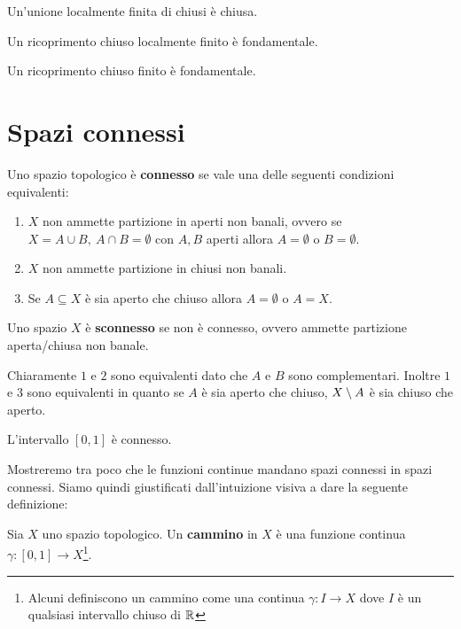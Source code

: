 \begin{multicols*}{2}
\begin{corollary}
Un'unione localmente finita di chiusi è chiusa.
\end{corollary}

\begin{theorem}\label{RicoprimentoChiusoLocalmenteFinitoEFondamentale}
Un ricoprimento chiuso localmente finito è fondamentale.
\end{theorem}
\begin{corollary}
Un ricoprimento chiuso finito è fondamentale.
\end{corollary}

\section{Spazi connessi}

\begin{definition}[Connessione]
Uno spazio topologico è \textbf{connesso} se vale una delle seguenti condizioni equivalenti:
\begin{enumerate}[noitemsep]
\item $X$ non ammette partizione in aperti non banali, ovvero se $X=A\cup B,\ A\cap B=\emptyset$ con $A,B$ aperti allora $A=\emptyset$ o $B=\emptyset$.
\item $X$ non ammette partizione in chiusi non banali.
\item Se $A\subseteq X$ è sia aperto che chiuso allora $A=\emptyset$ o $A=X$.
\end{enumerate}
Uno spazio $X$ è \textbf{sconnesso} se non è connesso, ovvero ammette partizione aperta/chiusa non banale.
\end{definition}
\begin{remark}
Chiaramente $1$ e $2$ sono equivalenti dato che $A$ e $B$ sono complementari. Inoltre $1$ e $3$ sono equivalenti in quanto se $A$ è sia aperto che chiuso, $X\setminus A$ è sia chiuso che aperto.
\end{remark}

\begin{theorem}
L'intervallo $[0,1]$ è connesso.
\end{theorem}

\noindent Mostreremo tra poco che le funzioni continue mandano spazi connessi in spazi connessi. Siamo quindi giustificati dall'intuizione visiva a dare la seguente definizione:
\begin{definition}[Cammino]
Sia $X$ uno spazio topologico. Un \textbf{cammino} in $X$ è una funzione continua $\gamma:[0,1]\to X$\footnote{Alcuni definiscono un cammino come una continua $\gamma:I\to X$ dove $I$ è un qualsiasi intervallo chiuso di $\mathbb{R}$}.
\end{definition}


\end{multicols*}
